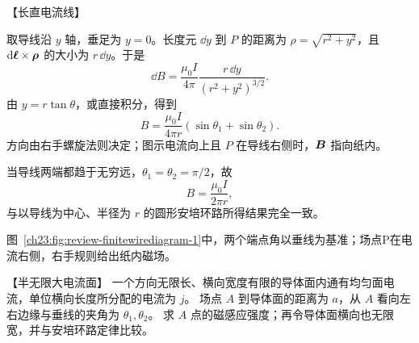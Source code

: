{\begin{origexamplebox}{【长直电流线】}
%
\begin{center}
\end{center}
\end{origexamplebox}

\begin{xesolution}
取导线沿 $y$ 轴，垂足为 $y=0$。长度元 $\dd y$ 到 $P$ 的距离为
$\rho=\sqrt{r^2+y^2}$，且 $\mathop{}\!\mathrm d\bm{\ell}\times\bm{\rho}$ 的大小为 $r\,\dd y$。于是
\[
  \dd B=\frac{\mu_0I}{4\pi}\frac{r\,\dd y}{(r^2+y^2)^{3/2}}.
\]
由 $y=r\tan\theta$，或直接积分，得到
\begin{equation}
  \boxed{B=\frac{\mu_0I}{4\pi r}
  (\sin\theta_1+\sin\theta_2)}.
\end{equation}
方向由右手螺旋法则决定；图示电流向上且 $P$ 在导线右侧时，$\bm{B}$ 指向纸内。

当导线两端都趋于无穷远，$\theta_1=\theta_2=\pi/2$，故
\[
  \boxed{B=\frac{\mu_0I}{2\pi r}},
\]
与以导线为中心、半径为 $r$ 的圆形安培环路所得结果完全一致。

图~\ref{ch23:fig:review-finitewirediagram-1}中，两个端点角以垂线为基准；场点P在电流右侧，右手规则给出纸内磁场。
\par\noindent\begin{minipage}{\linewidth}
\finiteWireDiagram
{}
\end{minipage}\par\medskip
\end{xesolution}



\begin{origexamplebox}{【半无限大电流面】}\label{ch23:ex:s39-8-2}
一个方向无限长、横向宽度有限的导体面内通有均匀面电流，单位横向长度所分配的电流为 $j$。
场点 $A$ 到导体面的距离为 $a$，从 $A$ 看向左右边缘与垂线的夹角为 $\theta_1,\theta_2$。
求 $A$ 点的磁感应强度；再令导体面横向也无限宽，并与安培环路定律比较。


\end{origexamplebox}}
